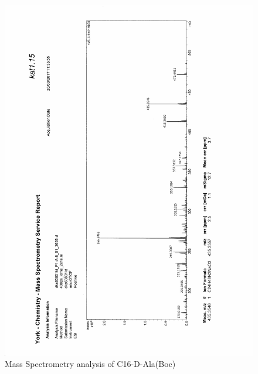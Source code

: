\begin{figure}[ht!]
\centering
\includegraphics[scale=0.75]{Mass_Spec/KAT1_15.PDF}
\caption{Mass Spectrometry analysis of C16-D-Ala(Boc)}
\end{figure}

